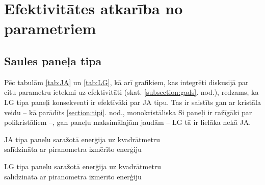 \section{Efektivitātes atkarība no parametriem}
\subsection{Saules paneļa tipa} \label{subsection:tipi}

Pēc tabulām \ref{tab:JA} un \ref{tab:LG}, kā arī grafikiem, kas integrēti diskusijā par citu parametru ietekmi uz efektivitāti (skat. \ref{subsection:gads}. nod.), redzams, ka LG tipa paneļi konsekventi ir efektīvāki par JA tipu. Tas ir saistīts gan ar kristāla veidu -- kā parādīts \ref{section:tipi}. nod.,  monokristāliska Si paneļi ir ražīgāki par polikristāliem --, gan paneļu maksimālajām jaudām -- LG tā ir lielāka nekā JA.

\begin{table}[h!]
    \caption{JA tipa paneļu saražotā enerģija uz kvadrātmetru\\ salīdzināta ar piranometra izmērīto enerģiju}
    \begin{center}
    
    \end{center} \label{tab:JA}
\end{table}
\begin{table}[h!]
    \caption{LG tipa paneļu saražotā enerģija uz kvadrātmetru\\ salīdzināta ar piranometra izmērīto enerģiju}
    \begin{center}
    
    \end{center} \label{tab:LG}
\end{table}

